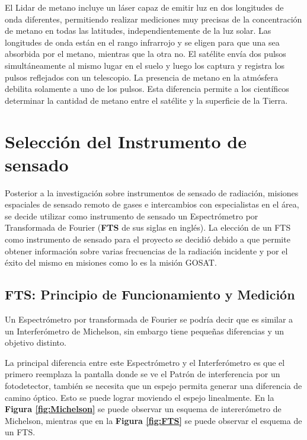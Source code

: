 \documentclass[11pt,titlepage]{article}
\begin{document}
El Lidar de metano incluye un láser capaz de emitir luz en dos longitudes de onda diferentes, permitiendo realizar mediciones muy precisas de la concentración de metano en todas las latitudes, independientemente de la luz solar. Las longitudes de onda están en el rango infrarrojo y se eligen para que una sea absorbida por el metano, mientras que la otra no. El satélite envía dos pulsos simultáneamente al mismo lugar en el suelo y luego los captura y registra los pulsos reflejados con un telescopio.
La presencia de metano en la atmósfera debilita solamente a uno de los pulsos. Esta diferencia permite a los científicos determinar la cantidad de metano entre el satélite y la superficie de la Tierra.

\section{Selección del Instrumento de sensado}

Posterior a la investigación sobre instrumentos de sensado de radiación, misiones espaciales de sensado remoto de gases e intercambios con especialistas en el área, se decide utilizar como instrumento de sensado un Espectrómetro por Transformada de Fourier (\textbf{FTS} de sus siglas en inglés). La elección de un FTS como instrumento de sensado para el proyecto se decidió debido a que permite obtener información sobre varias frecuencias de la radiación incidente y por el éxito del mismo en misiones como lo es la misión GOSAT.

\subsection{FTS: Principio de Funcionamiento y Medición}

Un Espectrómetro por transformada de Fourier se podría decir que es similar a un Interferómetro de Michelson, sin embargo tiene pequeñas diferencias y un objetivo distinto.\par
La principal diferencia entre este Espectrómetro y el Interferómetro es que el primero reemplaza la pantalla donde se ve el Patrón de interferencia por un fotodetector, también se necesita que un espejo permita generar una diferencia de camino óptico. Esto se puede lograr moviendo el espejo linealmente. En la \textbf{Figura \ref{fig:Michelson}} se puede observar un esquema de intererómetro de Michelson, mientras que en la \textbf{Figura \ref{fig:FTS}} se puede observar el esquema de un FTS.\par
\end{document}
